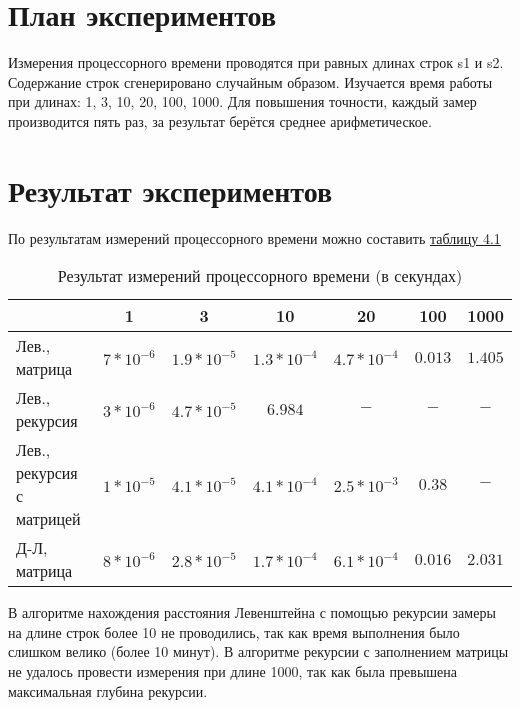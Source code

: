 \section*{План экспериментов}
Измерения процессорного времени проводятся при равных длинах строк s1 и s2. Содержание строк сгенерировано случайным образом. Изучается время работы при длинах: 1, 3, 10, 20, 100, 1000. Для повышения точности, каждый замер производится пять раз, за результат берётся среднее арифметическое.

\section*{Результат экспериментов}
По результатам измерений процессорного времени можно составить \hyperref[table_4_1]{таблицу 4.1}

\begin{table}[h] \label{table_4_1}
\caption{Результат измерений процессорного времени (в секундах)}
\begin{tabular}{| p{2cm} | c | c | c | c | c | c |}
	\hline
	& 1				&3				&10				&20				&100		&1000 \\
	\hline\hline
	Лев., матрица	&$7*10^{-6}$	&$1.9*10^{-5}$	&$1.3*10^{-4}$	&$4.7*10^{-4}$	&$0.013$	&$1.405$ \\
	\hline
	Лев., рекурсия	&$3*10^{-6}$	&$4.7*10^{-5}$	&$6.984$		&$-$			&$-$		&$-$ \\
	\hline
	Лев., рекурсия с матрицей
	&$1*10^{-5}$	&$4.1*10^{-5}$	&$4.1*10^{-4}$	&$2.5*10^{-3}$	&$0.38$		&$-$ \\
	\hline
	Д-Л, матрица	&$8*10^{-6}$	&$2.8*10^{-5}$	&$1.7*10^{-4}$	&$6.1*10^{-4}$	&$0.016$	&$2.031$ \\
	\hline
\end{tabular}
\end{table}

В алгоритме нахождения расстояния Левенштейна с помощью рекурсии замеры на длине строк более 10 не проводились, так как время выполнения было слишком велико (более 10 минут). В алгоритме рекурсии с заполнением матрицы не удалось провести измерения при длине 1000, так как была превышена максимальная глубина рекурсии.

